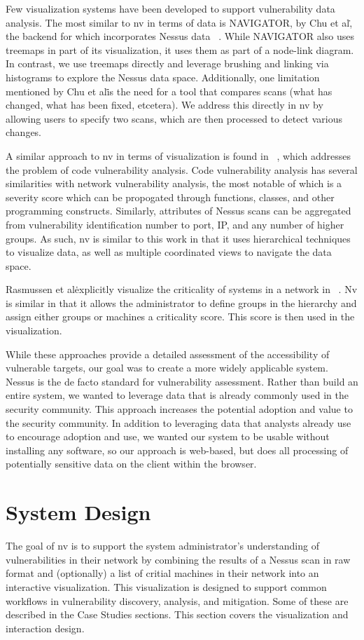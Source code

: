 \documentclass{acm_proc_article-sp}
\begin{document}
Few visualization systems have been developed to support vulnerability data analysis. 
The most similar to nv in terms of data is NAVIGATOR, by Chu et al\., the backend for which incorporates Nessus data ~\cite{Chu:2010wx}.
While NAVIGATOR also uses treemaps in part of its visualization, it uses them as part of a node-link diagram. 
In contrast, we use treemaps directly and leverage brushing and linking via histograms to explore the Nessus data space.
Additionally, one limitation mentioned by Chu et al\. is the need for a tool that compares scans (what has changed, what has been fixed, etcetera). 
We address this directly in nv by allowing users to specify two scans, which are then processed to detect various changes.

A similar approach to nv in terms of visualization is found in ~\cite{Goodall:2010vi}, which addresses the problem of code vulnerability analysis. Code vulnerability analysis has several similarities with network vulnerability analysis, the most notable of which is a severity score which can be propogated through functions, classes, and other programming constructs. Similarly, attributes of Nessus scans can be aggregated from vulnerability identification number to port, IP, and any number of higher groups. As such, nv is similar to this work in that it uses hierarchical techniques to visualize data, as well as multiple coordinated views to navigate the data space.   

Rasmussen et al\. explicitly visualize the criticality of systems in a network in ~\cite{Rasmussen:2010th}. Nv is similar in that it allows the administrator to define groups in the hierarchy and assign either groups or machines a criticality score. This score is then used in the visualization. 

While these approaches provide a detailed assessment of the accessibility of vulnerable targets, our goal was to create a more widely applicable system. Nessus is the de facto standard for vulnerability assessment. Rather than build an entire system, we wanted to leverage data that is already commonly used in the security community. This approach increases the potential adoption and value to the security community. In addition to leveraging data that analysts already use to encourage adoption and use, we wanted our system to be usable without installing any software, so our approach is web-based, but does all processing of potentially sensitive data on the client within the browser.

\section{System Design}
The goal of nv is to support the system administrator's understanding of vulnerabilities in their network by combining the results of a Nessus scan in raw format and (optionally) a list of critial machines in their network into an interactive visualization.
This visualization is designed to support common workflows in vulnerability discovery, analysis, and mitigation.
Some of these are described in the Case Studies sections.
This section covers the visualization and interaction design.
\end{document}
